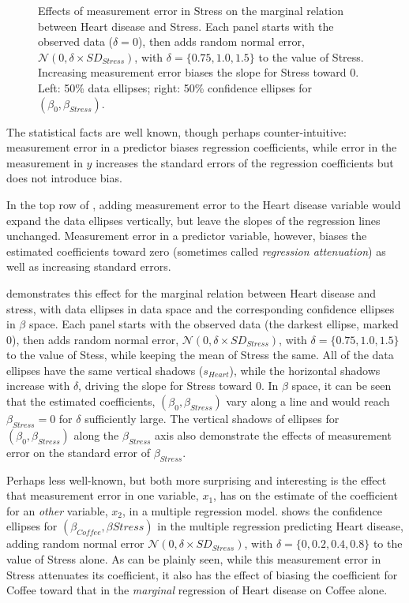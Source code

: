 \begin{figure}[htb]
\begin{minipage}[b]{.49\linewidth}
 \end{minipage}
  \caption{Effects of measurement error in Stress on the marginal relation between Heart disease and Stress.
  Each panel starts with the observed data ($\delta=0$), then adds random normal error,
  $\mathcal{N}(0, \delta \times SD_{Stress})$, with $\delta = \{0.75, 1.0, 1.5\}$ to the value of Stress.
  Increasing measurement error biases the slope for Stress toward 0.
  Left: 50\% data ellipses; right: 50\% confidence ellipses for $(\beta_0, \beta_{Stress})$. }
  \label{fig:coffee-stress}
\end{figure}

The statistical facts are well known, though perhaps counter-intuitive:
measurement error in a predictor biases regression coefficients, while
error in the measurement in  $y$
increases the standard errors of the regression coefficients but does not introduce
bias.


In the top row of
, adding measurement error to the Heart disease variable
would expand the data ellipses vertically, but leave the slopes of the regression lines unchanged.
Measurement error in a predictor variable, however, biases the estimated coefficients toward
zero (sometimes called \emph{regression attenuation}) as well as increasing standard errors.

 demonstrates this effect for the marginal
relation between Heart disease and stress,
with data ellipses in data space and the corresponding confidence ellipses in $\beta$ space.
Each panel starts with the observed data (the darkest ellipse, marked $0$), then adds random normal error,
$\mathcal{N}(0, \delta \times SD_{Stress})$, with $\delta = \{0.75, 1.0, 1.5\}$ to the value of Stess,
while keeping the mean of Stress the same.
All of the data ellipses have the same vertical shadows ($s_{Heart}$), while the horizontal shadows
increase with $\delta$, driving the slope for Stress toward 0.
In $\beta$ space, it can be seen that the estimated coefficients, $(\beta_0, \beta_{Stress})$
vary along a line and would reach $\beta_{Stress}=0$ for $\delta$ sufficiently large.
The vertical shadows of
ellipses for $(\beta_0, \beta_{Stress})$ along the $\beta_{Stress}$ axis
also demonstrate the effects of measurement error
on the standard error of $\beta_{Stress}$.

Perhaps less well-known, but both more surprising and interesting is the effect that measurement error in one variable,
$x_1$, 
has on the estimate of the coefficient for an \emph{other} variable, $x_2$, in a multiple regression model.
shows the confidence ellipses for $(\beta_{Coffee}, \beta{Stress})$ in the multiple regression 
predicting Heart disease, adding random normal error
$\mathcal{N}(0, \delta \times SD_{Stress})$, with $\delta = \{0, 0.2, 0.4, 0.8\}$ to the value of Stress
alone.  
As can be plainly seen, while this measurement error in Stress attenuates its coefficient,
it also has the effect of biasing the coefficient for Coffee toward that in the \emph{marginal}
regression of Heart disease on Coffee alone.



